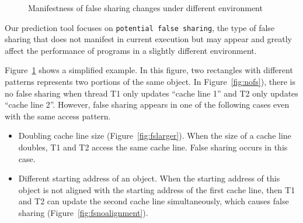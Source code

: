 \begin{figure}
\begin{center} 
%
\hspace{30pt}
%
\hspace{30pt}
%
\end{center}
\caption{Manifestness of false sharing changes under different environment}
\label{fig:potentialfalsesharing}
\end{figure}
Our prediction tool focuses on \texttt{potential false sharing}, the type of
false sharing that does not 
manifest in current execution but may appear and greatly affect the performance of programs
in a slightly different environment.

Figure~\ref{fig:potentialfalsesharing} shows a simplified example.
In this figure, two rectangles with different patterns
represents two portions of the same 
object. In Figure~\ref{fig:nofs}), there is no false sharing when thread T1 only updates 
``cache line 1'' and T2 only updates ``cache line 2''.
However, false sharing appears in one of the following cases even with the same
access pattern. 

\begin{itemize}
\item
Doubling cache line size (Figure~\ref{fig:fslarger}). When the size of a
cache line doubles,
T1 and T2 access the same cache line. False sharing occurs in this case.

\item
Different starting address of an object. 
When the starting address of this object is not aligned with the starting address of 
the first cache line, 
then T1 and T2 can update the second cache line simultaneously, 
which causes false sharing (Figure~\ref{fig:fsnoalignment}). 
\end{itemize} 

